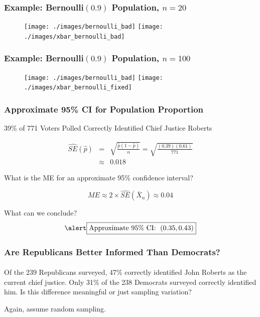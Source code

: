 \documentclass{beamer}
\begin{document}
\begin{frame}
\frametitle{Example: Bernoulli$(0.9)$ Population, $n =20$}
\begin{figure}
\centering
\texttt{[image: ./images/bernoulli\_bad]}
\texttt{[image: ./images/xbar\_bernoulli\_bad]}
\end{figure}
\end{frame}

\begin{frame}
\frametitle{Example: Bernoulli$(0.9)$ Population, $n =100$}
\begin{figure}
\centering
\texttt{[image: ./images/bernoulli\_bad]}
\texttt{[image: ./images/xbar\_bernoulli\_fixed]}
\end{figure}
\end{frame}

\begin{frame}
\frametitle{Approximate 95\% CI for Population Proportion}
39\% of 771 Voters Polled Correctly Identified Chief Justice Roberts

\begin{eqnarray*}
	\widehat{SE}(\widehat{p}) &=& \sqrt{\frac{\widehat{p}(1-\widehat{p})}{n}} = \sqrt{\frac{(0.39)(0.61)}{771}}\\ 
	&\approx& 0.018 
\end{eqnarray*}

\alert{What is the ME for an approximate 95\% confidence interval?} \pause

$$ME \approx 2 \times \widehat{SE}(\bar{X}_n) \approx 0.04$$ \pause

What can we conclude?
$$\alert{\boxed{\mbox{Approximate 95\% CI: } \; (0.35, 0.43)}}$$

\end{frame}

\begin{frame}
\frametitle{Are Republicans Better Informed Than Democrats?}
\framesubtitle{}
Of the 239 Republicans surveyed, 47\% correctly identified John Roberts as the current chief justice. Only 31\% of the 238 Democrats surveyed correctly identified him. Is this difference meaningful or just sampling variation?

\vspace{2em}
\alert{Again, assume random sampling.}



\end{frame}
\end{document}
